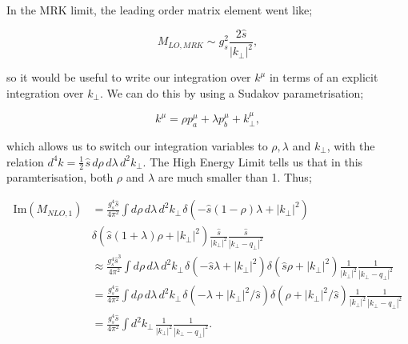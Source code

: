 In the MRK limit, the leading order matrix element went like;

\begin{equation}
M_{LO, MRK} \sim g_s^2 \frac{2 \hat{s}}{|k_\perp|^2},
\end{equation}

so it would be useful to write our integration over $k^\mu$ in terms of an explicit integration over $k_\perp$. We can do this by using a Sudakov parametrisation;

\begin{equation}
k^\mu = \rho p_a^\mu + \lambda p_b ^\mu + k_\perp^\mu,
\end{equation}

which allows us to switch our integration variables to $\rho, \lambda$ and $k_\perp$, with the relation $d^4k = \frac{1}{2} \hspace{1pt} \hat{s} \hspace{2pt} d \rho \hspace{2pt} d \lambda \hspace{2pt} d^2 k_\perp$. The High Energy Limit tells us that in this paramterisation, both $\rho$ and $\lambda$ are much smaller than 1. Thus;

\begin{equation}
\begin{split}
\text{Im}(M_{NLO,1}) & = \frac{g_s^4 \hat{s}}{ 4 \pi^2} \int d \rho \hspace{2pt} d \lambda \hspace{2pt} d^2 k_\perp \hspace{1pt} \delta(-\hat{s}(1-\rho) \lambda + |k_\perp|^2) \\
& \delta(\hat{s}(1+ \lambda) \rho + |k_\perp|^2) \frac{\hat{s}}{|k_\perp|^2} \frac{\hat{s}}{|k_\perp - q_\perp|^2}  \\
& \approx \frac{g_s^4 \hat{s}^3}{ 4 \pi^2} \int d \rho \hspace{2pt} d \lambda \hspace{2pt} d^2 k_\perp \hspace{1pt} \delta(-\hat{s} \lambda + |k_\perp|^2) \delta(\hat{s} \rho + |k_\perp|^2) \frac{1}{|k_\perp|^2} \frac{1}{|k_\perp - q_\perp|^2}  \\
&= \frac{g_s^4 \hat{s}}{ 4 \pi^2} \int d \rho \hspace{2pt} d \lambda \hspace{2pt} d^2 k_\perp \hspace{1pt} \delta(-\lambda + |k_\perp|^2/\hat{s}) \delta(\rho + |k_\perp|^2/\hat{s}) \frac{1}{|k_\perp|^2} \frac{1}{|k_\perp - q_\perp|^2} \\
&= \frac{g_s^4 \hat{s}}{ 4 \pi^2} \int d^2 k_\perp \hspace{1pt}  \frac{1}{|k_\perp|^2} \frac{1}{|k_\perp - q_\perp|^2}.
\end{split}
\end{equation}

